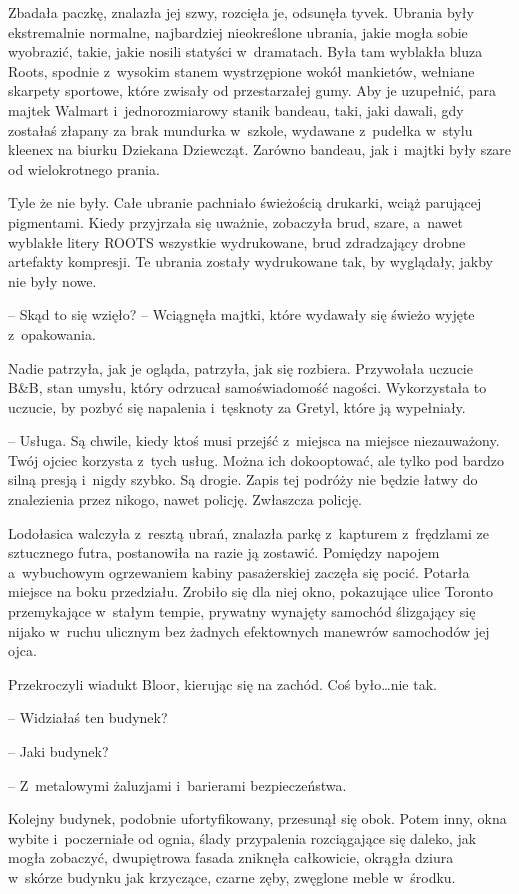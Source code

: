 \documentclass[oneside,polish,11pt,sfheadings]{mwbk}
\begin{document}
Zbadała paczkę, znalazła jej szwy, rozcięła je, odsunęła tyvek. Ubrania
były ekstremalnie normalne, najbardziej nieokreślone ubrania, jakie
mogła sobie wyobrazić, takie, jakie nosili statyści w~dramatach. Była
tam wyblakła bluza Roots, spodnie z~wysokim stanem wystrzępione wokół
mankietów, wełniane skarpety sportowe, które zwisały od przestarzałej
gumy. Aby je uzupełnić, para majtek Walmart i~jednorozmiarowy stanik
bandeau, taki, jaki dawali, gdy zostałaś złapany za brak mundurka w~szkole, wydawane z~pudełka w~stylu kleenex na biurku Dziekana Dziewcząt.
Zarówno bandeau, jak i~majtki były szare od wielokrotnego prania.

Tyle że nie były. Całe ubranie pachniało świeżością drukarki, wciąż
parującej pigmentami. Kiedy przyjrzała się uważnie, zobaczyła brud,
szare, a~nawet wyblakłe litery ROOTS wszystkie wydrukowane, brud
zdradzający drobne artefakty kompresji. Te ubrania zostały wydrukowane
tak, by wyglądały, jakby nie były nowe.

-- Skąd to się wzięło? -- Wciągnęła majtki, które wydawały się świeżo
wyjęte z~opakowania.

Nadie patrzyła, jak je ogląda, patrzyła, jak się rozbiera. Przywołała
uczucie B\&B, stan umysłu, który odrzucał samoświadomość nagości.
Wykorzystała to uczucie, by pozbyć się napalenia i~tęsknoty za Gretyl,
które ją wypełniały.

-- Usługa. Są chwile, kiedy ktoś musi przejść z~miejsca na miejsce
niezauważony. Twój ojciec korzysta z~tych usług. Można ich dokooptować,
ale tylko pod bardzo silną presją i~nigdy szybko. Są drogie. Zapis tej
podróży nie będzie łatwy do znalezienia przez nikogo, nawet policję.
Zwłaszcza policję.

Lodołasica walczyła z~resztą ubrań, znalazła parkę z~kapturem z~frędzlami ze sztucznego futra, postanowiła na razie ją zostawić.
Pomiędzy napojem a~wybuchowym ogrzewaniem kabiny pasażerskiej zaczęła
się pocić. Potarła miejsce na boku przedziału. Zrobiło się dla niej
okno, pokazujące ulice Toronto przemykające w~stałym tempie, prywatny
wynajęty samochód ślizgający się nijako w~ruchu ulicznym bez żadnych
efektownych manewrów samochodów jej ojca.

Przekroczyli wiadukt Bloor, kierując się na zachód. Coś było\ldots  nie tak.

-- Widziałaś ten budynek?

-- Jaki budynek?

-- Z~metalowymi żaluzjami i~barierami bezpieczeństwa.

Kolejny budynek, podobnie ufortyfikowany, przesunął się obok. Potem
inny, okna wybite i~poczerniałe od ognia, ślady przypalenia rozciągające
się daleko, jak mogła zobaczyć, dwupiętrowa fasada zniknęła całkowicie,
okrągła dziura w~skórze budynku jak krzyczące, czarne zęby, zwęglone
meble w~środku.
\end{document}
